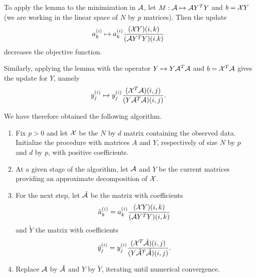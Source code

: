 \bigskip

 To apply the lemma to the minimization in ${\mathcal A}$, let $M: {\mathcal A} \mapsto {\mathcal A} Y^TY$ and $b={\mathcal X} Y$ (we are working in the linear space of $N$ by $p$ matrices). 
 Then  the update
\[
a_k^{(i)} \mapsto a_k^{(i)} \frac{({\mathcal X} Y)(i,k)}{({\mathcal A} Y^TY)(i. k)}
\]
decreases the objective function. 

Similarly, applying the lemma with the operator $Y \mapsto Y{\mathcal A}^T{\mathcal A}$ and $b = {\mathcal X}^T{\mathcal A}$ gives the update for $Y$, namely
\[
y_j^{(i)} \mapsto y_j^{(i)} \frac{({\mathcal X}^T {\mathcal A})(i,j)}{(Y {\mathcal A}^T{\mathcal A})(i,j)}.
\]

We have therefore obtained the following algorithm.
\begin{algorithm}
\label{alg:nmf.quadratic}
\begin{enumerate}[label=\arabic*., wide=0.5cm]
\item Fix $p>0$ and let ${\mathcal X}$ be the $N$ by $d$ matrix containing the observed data. Initialize the procedure with matrices $A$ and $Y$, respectively of size $N$ by $p$ and $d$ by $p$, with positive coefficients.

\item At a given stage of the algorithm, let ${\mathcal A}$ and $Y$ be the current matrices providing an approximate decomposition of ${\mathcal X}$. 
\item For the next step, let $\tilde{{\mathcal A}}$ be the matrix with coefficients
\[
\tilde a_k^{(i)}  = a_k^{(i)} \frac{({\mathcal X} Y)(i,k)}{({\mathcal A} Y^TY)(i,k)}
\]
and $\tilde Y$ the matrix with coefficients
\[
\tilde y_j^{(i)} = y_j^{(i)} \frac{({\mathcal X}^T \tilde{{\mathcal A}})(i,j)}{(Y \tilde{{\mathcal A}}^T\tilde{{\mathcal A}})(i,j)}.
\]
\item
Replace ${\mathcal A}$ by $\tilde {{\mathcal A}}$ and $Y$ by $\tilde Y$, iterating until numerical convergence.
\end{enumerate}
\end{algorithm}

\bigskip

